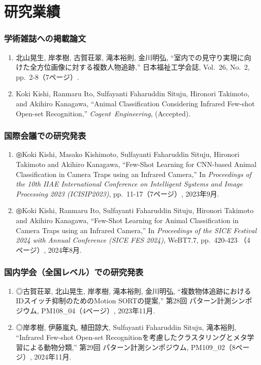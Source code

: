 
\chapter*{研究業績}

\subsection*{学術雑誌への掲載論文}
\begin{enumerate}
  \item 北山晃生, 岸孝樹, 古賀荘翠, 滝本裕則, 金川明弘, ``室内での見守り実現に向けた全方位画像に対する複数人物追跡,'' 日本福祉工学会誌, Vol.~26, No.~2, pp.~2-8（7ページ）.
  \item Koki Kishi, Ranmaru Ito, Sulfayanti Faharuddin Situju, Hironori Takimoto, and Akihiro Kanagawa, ``Animal Classification Considering Infrared Few-shot Open-set Recognition,'' \mbox{\textit{Cogent Engineering}}, (Accepted).
\end{enumerate}

\subsection*{国際会議での研究発表}
\begin{enumerate}
  \item ◎Koki Kishi, Masako Kishimoto, Sulfayanti Faharuddin Situju, Hironori Takimoto and Akihiro Kanagawa, ``Few-Shot Learning for CNN-based Animal Classification in Camera Traps using an Infrared Camera,'' In \textit{Proceedings of the 10th IIAE International Conference on Intelligent Systems and Image Processing 2023 (ICISIP2023)}, pp.~11-17（7ページ）, 2023年9月.
  \item ◎Koki Kishi, Ranmaru Ito, Sulfayanti Faharuddin Situju, Hironori Takimoto and Akihiro Kanagawa, ``Few-Shot Learning for Animal Classification in Camera Traps using an Infrared Camera,'' In \textit{Proceedings of the SICE Festival 2024 with Annual Conference (SICE FES 2024)}, WeBT7.7, pp.~420-423 （4ページ）, 2024年8月.
\end{enumerate}

\subsection*{国内学会（全国レベル）での研究発表}
\begin{enumerate}
  \item ◎古賀荘翠, 北山晃生, 岸孝樹, 滝本裕則, 金川明弘, ``複数物体追跡におけるIDスイッチ抑制のためのMotion SORTの提案,'' 第28回 パターン計測シンポジウム, PM108\_04（4ページ）, 2023年11月.
  \item ◎岸孝樹, 伊藤嵐丸, 植田諒大, Sulfayanti Faharuddin Situju, 滝本裕則, ``Infrared Few-shot Open-set Recognitionを考慮したクラスタリングとメタ学習による動物分類,'' 第29回 パターン計測シンポジウム, PM109\_02（8ページ）, 2024年11月.
\end{enumerate}

